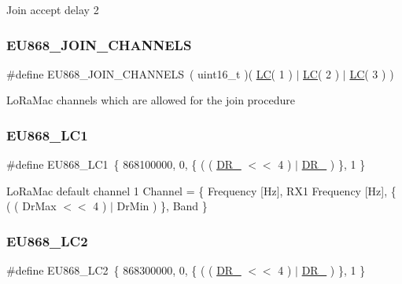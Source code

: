 Join accept delay 2 \mbox{\label{group__REGIONEU868_ga66750d8b2f9ba9f6b8466f190207d53f}} 
\subsubsection{\texorpdfstring{E\+U868\+\_\+\+J\+O\+I\+N\+\_\+\+C\+H\+A\+N\+N\+E\+LS}{EU868\_JOIN\_CHANNELS}}
{\footnotesize\ttfamily \#define E\+U868\+\_\+\+J\+O\+I\+N\+\_\+\+C\+H\+A\+N\+N\+E\+LS~( uint16\+\_\+t )( \hyperlink{group__REGION_ga12fa17e5c1016e01a9d82c25027deb1b}{LC}( 1 ) $\vert$ \hyperlink{group__REGION_ga12fa17e5c1016e01a9d82c25027deb1b}{LC}( 2 ) $\vert$ \hyperlink{group__REGION_ga12fa17e5c1016e01a9d82c25027deb1b}{LC}( 3 ) )}

Lo\+Ra\+Mac channels which are allowed for the join procedure \mbox{\label{group__REGIONEU868_ga397b82ce41a0eb594465b5728586d76e}} 
\subsubsection{\texorpdfstring{E\+U868\+\_\+\+L\+C1}{EU868\_LC1}}
{\footnotesize\ttfamily \#define E\+U868\+\_\+\+L\+C1~\{ 868100000, 0, \{ ( ( \hyperlink{group__REGION_ga872e12c82020c02a7f70a1c6ed1375df}{D\+R\+\_} $<$$<$ 4 ) $\vert$ \hyperlink{group__REGION_ga6c4ef966b4f3d5eb7597b087f2b97095}{D\+R\+\_} ) \}, 1 \}}

Lo\+Ra\+Mac default channel 1 Channel = \{ Frequency \mbox{[}Hz\mbox{]}, R\+X1 Frequency \mbox{[}Hz\mbox{]}, \{ ( ( Dr\+Max $<$$<$ 4 ) $\vert$ Dr\+Min ) \}, Band \} \mbox{\label{group__REGIONEU868_ga992597dafaae7a354ae4aeaab6306954}} 
\subsubsection{\texorpdfstring{E\+U868\+\_\+\+L\+C2}{EU868\_LC2}}
{\footnotesize\ttfamily \#define E\+U868\+\_\+\+L\+C2~\{ 868300000, 0, \{ ( ( \hyperlink{group__REGION_ga872e12c82020c02a7f70a1c6ed1375df}{D\+R\+\_} $<$$<$ 4 ) $\vert$ \hyperlink{group__REGION_ga6c4ef966b4f3d5eb7597b087f2b97095}{D\+R\+\_} ) \}, 1 \}}

